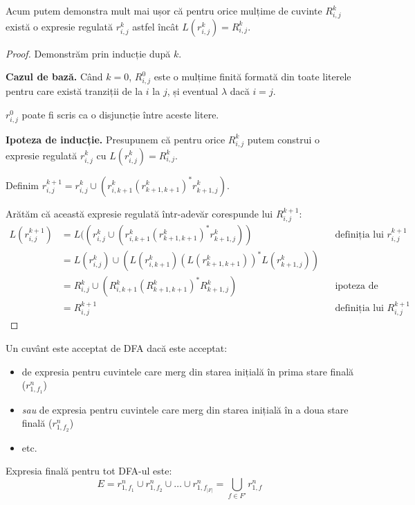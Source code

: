 \documentclass[a4paper, 12pt]{article}
\begin{document}
Acum putem demonstra mult mai ușor că pentru orice mulțime de cuvinte \(R_{i, j}^{k}\) există o expresie regulată \(r_{i, j}^{k}\) astfel încât \(L(r_{i, j}^{k}) = R_{i, j}^{k}\).
\begin{proof}
Demonstrăm prin inducție după \(k\).

\medskip

\textbf{Cazul de bază.} Când \(k = 0\), \(R_{i, j}^{0}\) este o mulțime finită formată din toate literele
pentru care există tranziții de la \(i\) la \(j\), și eventual \(\lambda\) dacă \(i = j\).

\(r_{i, j}^{0}\) poate fi scris ca o disjuncție între aceste litere.

\medskip

\textbf{Ipoteza de inducție.} Presupunem că pentru orice \(R_{i, j}^{k}\) putem construi o expresie regulată \(r_{i, j}^{k}\) cu \(L(r_{i, j}^{k}) = R_{i, j}^{k}\).

\smallskip

Definim \(r_{i, j}^{k + 1} = r_{i, j}^{k} \cup (r_{i, k + 1}^{k} (r_{k + 1, k + 1}^{k})^{*} r_{k + 1, j}^{k})\).

Arătăm că această expresie regulată într-adevăr corespunde lui \(R_{i, j}^{k + 1}\):
\begin{align*}
L(r_{i, j}^{k + 1}) &= L((r_{i, j}^{k} \cup (r_{i, k + 1}^{k} (r_{k + 1, k + 1}^{k})^{*} r_{k + 1, j}^{k})) && \text{definiția lui \(r_{i, j}^{k + 1}\)} \\
&= L(r_{i, j}^{k}) \cup (L(r_{i, k + 1}^{k}) (L(r_{k + 1, k + 1}^{k}))^{*} L(r_{k + 1, j}^{k})) \\
&= R_{i, j}^{k} \cup (R_{i, k + 1}^{k} (R_{k + 1, k + 1}^{k})^{*} R_{k + 1, j}^{k}) && \text{ipoteza de inducție} \\
&= R_{i, j}^{k + 1} && \text{definiția lui \(R_{i, j}^{k + 1}\)}
\end{align*}
\end{proof}

Un cuvânt este acceptat de DFA dacă este acceptat:
\begin{itemize}
    \item de expresia pentru cuvintele care merg din starea inițială în prima stare finală (\(r_{1, f_1}^{n}\))
    \item \emph{sau} de expresia pentru cuvintele care merg din starea inițială în a doua stare finală (\(r_{1, f_2}^{n}\))
    \item etc.
\end{itemize}

Expresia finală pentru tot DFA-ul este:
\[
E = r_{1, f_1}^{n} \cup r_{1, f_2}^{n} \cup \dots \cup r_{1, f_{|F|}}^{n} = \bigcup\limits_{f \in F'} r_{1, f}^{n}
\]
\end{document}
